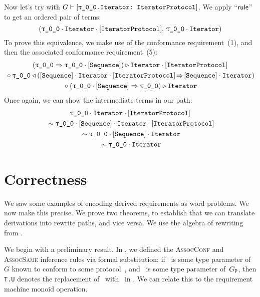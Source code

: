 \documentclass[../generics]{subfiles}
\begin{document}
\begin{example}
Now let's try with $G\vdash\ConfReq{\rT.Iterator}{IteratorProtocol}$. We apply ``$\mathsf{rule}$'' to get an ordered pair of terms:
\[
(\rT\cdot\nIterator\cdot\pIterator,\,\rT\cdot\nIterator)
\]
To prove this equivalence, we make use of the conformance requirement~(1), and then the associated conformance requirement~(5):
\begin{gather*}
(\rT\Rightarrow\rT\cdot\pSequence)\WR\nIterator\cdot\pIterator\\
{} \circ \rT\WL(\pSequence\cdot\nIterator\cdot\pIterator\!\Rightarrow\!\pSequence\cdot\nIterator)\\
{} \circ (\rT\cdot\pSequence\Rightarrow\rT)\WR\nIterator
\end{gather*}
Once again, we can show the intermediate terms in our path:
\begin{gather*}
\rT\cdot\nIterator\cdot\pIterator\\
{} \sim \rT\cdot\pSequence\cdot\nIterator\cdot\pIterator\\
{} \sim \rT\cdot\pSequence\cdot\nIterator\\
{} \sim \rT\cdot\nIterator
\end{gather*}
\end{example}

\section{Correctness}\label{rqm correctness}

We saw some examples of encoding derived requirements as word problems. We now make this precise. We prove two theorems, to establish that we can translate derivations into rewrite paths, and vice versa. We use the algebra of rewriting from .

We begin with a preliminary result. In , we defined the \textsc{AssocConf} and \textsc{AssocSame} inference rules via formal substitution: if \tT\ is some type parameter of~$G$ known to conform to some protocol~\tP, and \SelfU\ is some type parameter of~$G_{\texttt{P}}$, then \texttt{T.U} denotes the replacement of \tSelf\ with \tT\ in \SelfU. We can relate this to the requirement machine monoid operation.
\end{document}
